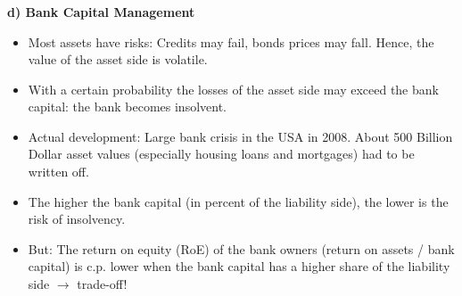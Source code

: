 \documentclass[11pt]{beamer}
\begin{document}

\begin{frame}
\frametitle{\insertsection}

\textbf{d) Bank Capital Management}

\begin{itemize}
\item Most assets have risks: Credits may fail, bonds prices may fall. Hence, the value of the asset side is volatile.

\item With a certain probability the losses of the asset side may exceed the bank capital: the bank becomes insolvent.

\item Actual development: Large bank crisis in the USA in 2008. About 500 Billion Dollar asset values (especially housing loans and mortgages) had to be written off.

\item The higher the bank capital (in percent of the liability side), the lower is the risk of insolvency.

\item But: The return on equity (RoE) of the bank owners (return on assets / bank capital) is c.p. lower when the bank capital has a higher share of the liability side $\rightarrow$ trade-off!
\end{itemize}

\end{frame}


%
\end{document}
